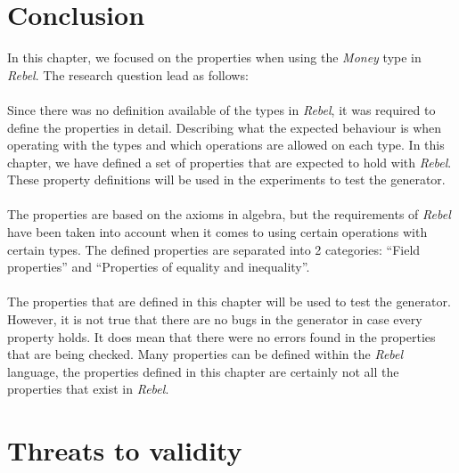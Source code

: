 \section{Conclusion}
In this chapter, we focused on the properties when using the \textit{Money}
type in \textit{Rebel}. The research question lead as follows:\rqOne\\
\\
Since there was no definition available of the types in \textit{Rebel}, it was
required to define the properties in detail. Describing what the expected
behaviour is when operating with the types and which operations are allowed on
each type. In this chapter, we have defined a set of properties that are
expected to hold with \textit{Rebel}. These property definitions will be used in the experiments to test the generator.\\
\\
The properties are based on the axioms in algebra, but the requirements of
\textit{Rebel} have been taken into account when it comes to using certain
operations with certain types. The defined properties are separated into 2
categories: ``Field properties'' and ``Properties of equality and inequality''.
\\
\\
The properties that are defined in this chapter will be used to test the
generator. However, it is not true that there are no bugs in the generator in
case every property holds. It does mean that there were no errors found in the
properties that are being checked. Many properties can be defined within the
\textit{Rebel} language, the properties defined in this chapter are certainly
not all the properties that exist in \textit{Rebel}.

\section{Threats to validity}
